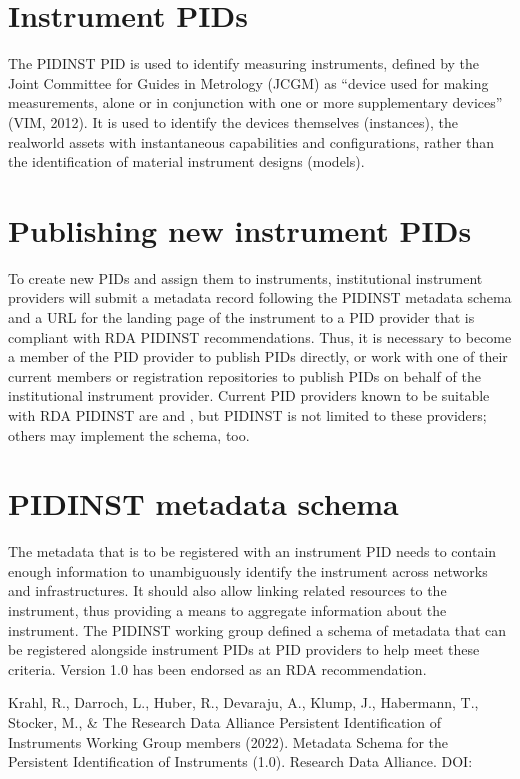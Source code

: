 \documentclass[a4paper,10pt,english]{sphinxmanual}
\begin{document}
\section{Instrument PIDs}
\label{\detokenize{white-paper/instrument-pids:instrument-pids}}\label{\detokenize{white-paper/instrument-pids::doc}}
\sphinxAtStartPar
The PIDINST PID is used to identify measuring instruments, defined by
the Joint Committee for Guides in Metrology (JCGM) as “device used for
making measurements, alone or in conjunction with one or more
supplementary devices” (VIM, 2012). It is used to identify the devices
themselves (instances), the real\sphinxhyphen{}world assets with instantaneous
capabilities and configurations, rather than the identification of
material instrument designs (models).


\section{Publishing new instrument PIDs}
\label{\detokenize{white-paper/publishing:publishing-new-instrument-pids}}\label{\detokenize{white-paper/publishing::doc}}
\sphinxAtStartPar
To create new PIDs and assign them to instruments, institutional
instrument providers will submit a metadata record following the PIDINST
metadata schema and a URL for the landing page of the instrument to a
PID provider that is compliant with RDA PIDINST recommendations. Thus,
it is necessary to become a member of the PID provider to publish PIDs
directly, or work with one of their current members or registration
repositories to publish PIDs on behalf of the institutional instrument
provider. Current PID providers known to be suitable with RDA PIDINST
are  and , but PIDINST is not limited to these
providers; others may implement the schema, too.


\section{PIDINST metadata schema}
\label{\detokenize{white-paper/metadata-schema:pidinst-metadata-schema}}\label{\detokenize{white-paper/metadata-schema:id1}}\label{\detokenize{white-paper/metadata-schema::doc}}
\sphinxAtStartPar
The metadata that is to be registered with an instrument PID needs to
contain enough information to unambiguously identify the instrument
across networks and infrastructures.  It should also allow linking
related resources to the instrument, thus providing a means to
aggregate information about the instrument.  The PIDINST working group
defined a schema of metadata that can be registered alongside
instrument PIDs at PID providers to help meet these criteria.  Version
1.0 has been endorsed as an RDA recommendation.%
\begin{footnote}[1]\sphinxAtStartFootnote
Krahl, R., Darroch, L., Huber, R., Devaraju, A., Klump, J., Habermann, T.,
Stocker, M., \& The Research Data Alliance Persistent Identification of
Instruments Working Group members (2022). Metadata Schema for the
Persistent Identification of Instruments (1.0). Research Data Alliance.
DOI: 
%
\end{footnote}
\end{document}
